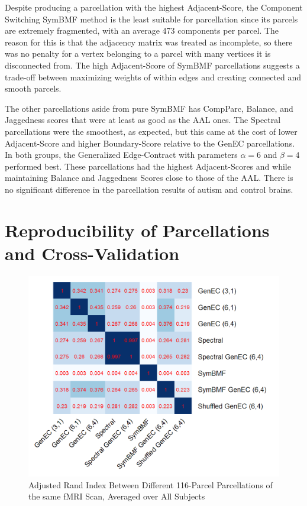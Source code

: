 Despite producing a parcellation with the highest Adjacent-Score, the
Component Switching SymBMF method is the least suitable for parcellation
since its parcels are extremely fragmented, with an average 473
components per parcel. The reason for this is that the adjacency matrix
was treated as incomplete, so there was no penalty for a vertex
belonging to a parcel with many vertices it is disconnected from.
The high Adjacent-Score of SymBMF parcellations suggests a trade-off
between maximizing weights of within edges and creating connected and
smooth parcels.

The other parcellations aside from pure SymBMF has CompParc, Balance,
and Jaggedness scores that were at least as good as the AAL ones.
The Spectral parcellations were the smoothest, as expected, but this
came at the cost of lower Adjacent-Score and higher Boundary-Score
relative to the GenEC parcellations.
In both groups, the Generalized Edge-Contract with parameters
$\alpha = 6$ and $\beta = 4$ performed best. These parcellations had
the highest Adjacent-Scores and while maintaining Balance and
Jaggedness Scores close to those of the AAL. There is no significant
difference in the parcellation results of autism and control brains.

\section{Reproducibility of Parcellations and Cross-Validation}

\begin{figure}
\caption{Adjusted Rand Index Between Different 116-Parcel %
Parcellations of the same fMRI Scan, Averaged over All Subjects}
\label{ari_same}
\includegraphics[scale = 1]{figs/8_ari_same.png}
\end{figure}

